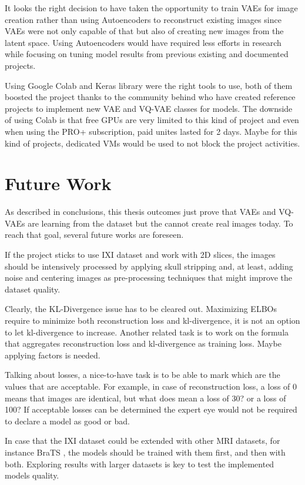 It looks the right decision to have taken the opportunity to train VAEs for image creation rather than using Autoencoders to reconstruct existing images since VAEs were not only capable of that but also of creating new images from the latent space. Using Autoencoders would have required less efforts in research while focusing on tuning model results from previous existing and documented projects.

Using Google Colab and Keras library were the right tools to use, both of them boosted the project thanks to the community behind who have created reference projects to implement new VAE and VQ-VAE classes for models. The downside of using Colab is that free GPUs are very limited to this kind of project and even when using the PRO+ subscription, paid unites lasted for 2 days. Maybe for this kind of projects, dedicated VMs would be used to not block the project activities.

\section{Future Work}

As described in conclusions, this thesis outcomes just prove that VAEs and VQ-VAEs are learning from the dataset but the cannot create real images today. To reach that goal, several future works are foreseen.

If the project sticks to use IXI dataset and work with 2D slices, the images should be intensively processed by applying skull stripping and, at least, adding noise and centering images as pre-processing techniques that might improve the dataset quality.

Clearly, the KL-Divergence issue has to be cleared out. Maximizing ELBOs require to minimize both reconstruction loss and kl-divergence, it is not an option to let kl-divergence to increase. Another related task is to work on the formula that aggregates reconstruction loss and kl-divergence as training loss. Maybe applying factors is needed. 

Talking about losses, a nice-to-have task is to be able to mark which are the values that are acceptable. For example, in case of reconstruction loss, a loss of 0 means that images are identical, but what does mean a loss of 30? or a loss of 100? If acceptable losses can be determined the expert eye would not be required to declare a model as good or bad.

In case that the IXI dataset could be extended with other MRI datasets, for instance BraTS \cite{brats}, the models should be trained with them first, and then with both. Exploring results with larger datasets is key to test the implemented models quality.